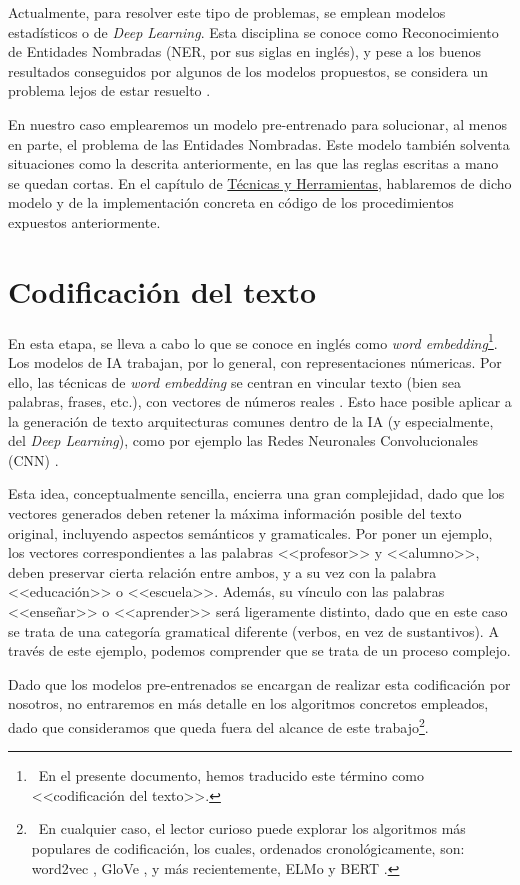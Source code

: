 Actualmente, para resolver este tipo de problemas, se emplean modelos estadísticos o de \emph{Deep Learning}. Esta disciplina se conoce como Reconocimiento de Entidades Nombradas (NER, por sus siglas en inglés), y pese a los buenos resultados conseguidos por algunos de los modelos propuestos, se considera un problema lejos de estar resuelto \cite{ner20}.

En nuestro caso emplearemos un modelo pre-entrenado para solucionar, al menos en parte, el problema de las Entidades Nombradas. Este modelo también solventa situaciones como la descrita anteriormente, en las que las reglas escritas a mano se quedan cortas. En el capítulo de \hyperref[chapter:tecnicas]{Técnicas y Herramientas}, hablaremos de dicho modelo y de la implementación concreta en código de los procedimientos expuestos anteriormente.

\bigskip

\section{Codificación del texto} \label{sec:codificacion}

En esta etapa, se lleva a cabo lo que se conoce en inglés como \emph{word embedding}\footnote{\, En el presente documento, hemos traducido este término como <<codificación del texto>>.}. Los modelos de IA trabajan, por lo general, con representaciones númericas. Por ello, las técnicas de \emph{word embedding} se centran en vincular texto (bien sea palabras, frases, etc.), con vectores de números reales \cite{manning19}. Esto hace posible aplicar a la generación de texto arquitecturas comunes dentro de la IA (y especialmente, del \emph{Deep Learning}), como por ejemplo las Redes Neuronales Convolucionales (CNN) \cite{hou20}.

Esta idea, conceptualmente sencilla, encierra una gran complejidad, dado que los vectores generados deben retener la máxima información posible del texto original, incluyendo aspectos semánticos y gramaticales. Por poner un ejemplo, los vectores correspondientes a las palabras <<profesor>> y <<alumno>>, deben preservar cierta relación entre ambos, y a su vez con la palabra <<educación>> o <<escuela>>. Además, su vínculo con las palabras <<enseñar>> o <<aprender>> será ligeramente distinto, dado que en este caso se trata de una categoría gramatical diferente (verbos, en vez de sustantivos). A través de este ejemplo, podemos comprender que se trata de un proceso complejo.

Dado que los modelos pre-entrenados se encargan de realizar esta codificación por nosotros, no entraremos en más detalle en los algoritmos concretos empleados, dado que consideramos que queda fuera del alcance de este trabajo\footnote{\, En cualquier caso, el lector curioso puede explorar los algoritmos más populares de codificación, los cuales, ordenados cronológicamente, son: word2vec \cite{word2vec1, word2vec2}, GloVe \cite{glove14}, y más recientemente, ELMo \cite{elmo18} y BERT \cite{bert18}.}.

